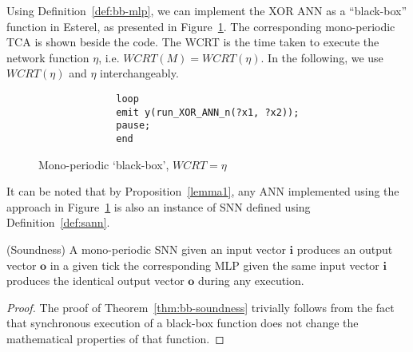 Using Definition~\ref{def:bb-mlp}, we can implement the XOR \ac{ANN} as a ``black-box'' function in Esterel, as presented in Figure~\ref{fig:tca-bb-n}. 
The corresponding mono-periodic \ac{TCA} is shown beside the code.
The \ac{WCRT} is the time taken to execute the network function
$\eta$, i.e. $WCRT\left(M\right) = WCRT\left( \eta\right)$. 
In the following, we use $WCRT(\eta)$ and $\eta$ interchangeably.

\begin{figure}[H]
	\centering
	\begin{subfigure}[]{0.15\textwidth}
		\centering
		
	\end{subfigure}%
	\begin{subfigure}[]{0.33\textwidth}
		\vspace{3mm}
		\begin{lstlisting}
		loop
		emit y(run_XOR_ANN_n(?x1, ?x2));
		pause;
		end
		\end{lstlisting}
	\end{subfigure}
	\caption{Mono-periodic `black-box', $WCRT = \eta$}
	\label{fig:tca-bb-n}
\end{figure}

It can be noted that by Proposition~\ref{lemma1}, any \ac{ANN} implemented using the approach in Figure~\ref{fig:tca-bb-n} is also an instance of \ac{SNN} defined using Definition~\ref{def:sann}.

\begin{theorem}
	\label{thm:bb-soundness}
	(Soundness) A mono-periodic \ac{SNN} given an input vector $\mathbf{i}$
	produces an output vector $\mathbf{o}$ in a given tick \miff the corresponding \ac{MLP} 
	given the same input vector $\mathbf{i}$ produces the identical output vector $\mathbf{o}$ during any execution.
	
\end{theorem}

\begin{proof}
	The proof of Theorem~\ref{thm:bb-soundness} trivially follows from the
	fact that synchronous execution of a black-box function does not change
	the mathematical properties of that function. %
\end{proof}

